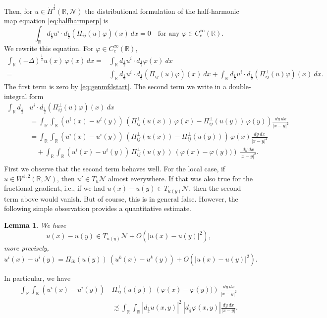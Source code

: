 \documentclass[12pt]{amsart}
\newtheorem{lemma}[theorem]{Lemma}
\theoremstyle{definition}
\newcommand{\R}{\mathbb{R}}
\newcommand{\brac}[1]{\left (#1 \right )}
\numberwithin{theorem}{section} \numberwithin{equation}{section}
\newcommand{\lap}{\Delta }
\newcommand{\aleq}{\precsim}
\newcommand{\laph}{(-\lap)^{\frac{1}{2}}}
\begin{document}
Then, for $u \in \dot{H}^{\frac{1}{2}}(\R,\mathcal{N})$ the distributional formulation of the half-harmonic map equation \eqref{eq:halfharmperp} is
\begin{equation}\label{eq:genmfdstart}
 \int_{\R} d_{\frac{1}{2}} u^i \cdot d_{\frac{1}{2}} (\Pi_{ij}(u)\varphi)(x)\ dx = 0 \quad \mbox{for any $\varphi \in C_c^\infty(\R)$}.
\end{equation}
We rewrite this equation. For $\varphi \in C_c^\infty(\R)$,
\[
\begin{split}
\int_{\R} \laph u(x)\, \varphi(x)\, dx=&\int_{\R}d_{\frac{1}{2}} u^i \cdot d_{\frac{1}{2}} \varphi (x)\ dx\\
 =&\int_{\R}d_{\frac{1}{2}} u^i \cdot d_{\frac{1}{2}} (\Pi_{ij}(u)\varphi)(x)\ dx + \int_{\R}d_{\frac{1}{2}} u^i \cdot d_{\frac{1}{2}} (\Pi_{ij}^\perp(u) \varphi)(x)\ dx.
\end{split}
 \]
The first term is zero by \eqref{eq:genmfdstart}. The second term we write in a double-integral form
\[
\begin{split}
 \int_{\R}d_{\frac{1}{2}}& u^i \cdot d_{\frac{1}{2}} (\Pi_{ij}^\perp(u) \varphi)(x)\ dx\\
 &=\int_{\R}\int_{\R} \brac{u^i(x)-u^i(y)}\, \brac{\Pi_{ij}^\perp(u(x))\, \varphi(x) - \Pi_{ij}^\perp(u(y))\, \varphi(y)}  \frac{dy\ dx}{|x-y|^{2}}\\
 &=\int_{\R}\int_{\R} \brac{u^i(x)-u^i(y)}\, \brac{\Pi_{ij}^\perp(u(x)) - \Pi_{ij}^\perp(u(y))}\, \varphi(x) \frac{dy\ dx}{|x-y|^{2}}\\
 &\quad +\int_{\R}\int_{\R} \brac{u^i(x)-u^i(y)}\, \Pi_{ij}^\perp(u(y))\ \brac{\varphi(x) -\varphi(y))}\ \frac{dy\ dx}{|x-y|^{2}}.\\
\end{split}
 \]
First we observe that the second term behaves well. For the local case, if $u \in W^{1,2}(\R,\mathcal{N})$, then $u' \in T_u \mathcal{N}$ almost everywhere. If that was also true for the fractional gradient, i.e., if we had $u(x)-u(y) \in T_{u(y)} \mathcal{N}$, then the second term above would vanish. But of course, this is in general false. However, the following simple observation provides a quantitative estimate.
\begin{lemma}\label{la:uxmuytangential}
We have \[u(x)-u(y) \in T_{u(y)} \mathcal{N} + O(|u(x)-u(y)|^2),\] more precisely,
\[
 u^i(x)-u^i(y)= \Pi_{ik}(u(y))\ (u^k(x)-u^k(y)) + O(|u(x)-u(y)|^2).
\]
\end{lemma}
In particular, we have
\[
\begin{split}
 \int_{\R}\int_{\R} \brac{u^i(x)-u^i(y)}\,& \Pi_{ij}^\perp(u(y))\  \brac{\varphi(x) -\varphi(y))}\ \frac{dy\ dx}{|x-y|^{2}}\\
 & \aleq \int_{\R}\int_{\R} |d_{\frac{1}{4}}u(x,y)|^2\ |d_{\frac{1}{2}}\varphi(x,y)| \frac{dy\ dx}{|x-y|}.
 \end{split}
\]
\end{document}
